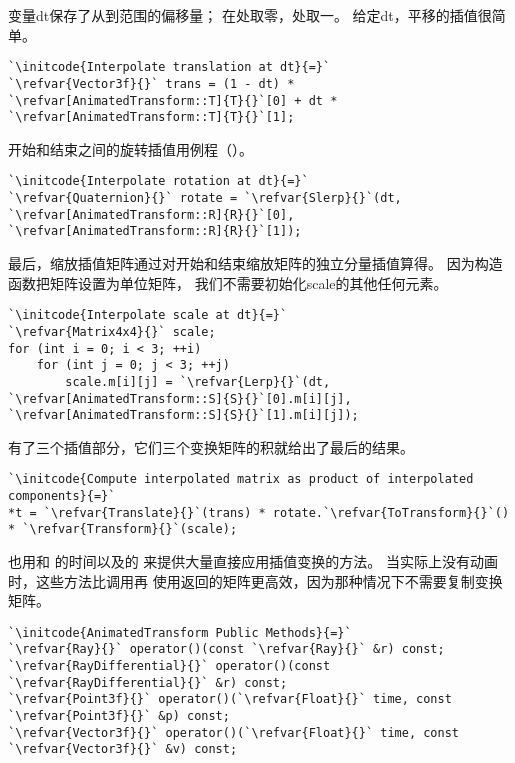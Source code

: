 变量{\ttfamily dt}保存了从到范围的偏移量；
在处取零，处取一。
给定{\ttfamily dt}，平移的插值很简单。
\begin{lstlisting}
`\initcode{Interpolate translation at dt}{=}`
`\refvar{Vector3f}{}` trans = (1 - dt) * `\refvar[AnimatedTransform::T]{T}{}`[0] + dt * `\refvar[AnimatedTransform::T]{T}{}`[1];
\end{lstlisting}

开始和结束之间的旋转插值用例程（）。
\begin{lstlisting}
`\initcode{Interpolate rotation at dt}{=}`
`\refvar{Quaternion}{}` rotate = `\refvar{Slerp}{}`(dt, `\refvar[AnimatedTransform::R]{R}{}`[0], `\refvar[AnimatedTransform::R]{R}{}`[1]);
\end{lstlisting}

最后，缩放插值矩阵通过对开始和结束缩放矩阵的独立分量插值算得。
因为构造函数把矩阵设置为单位矩阵，
我们不需要初始化{\ttfamily scale}的其他任何元素。
\begin{lstlisting}
`\initcode{Interpolate scale at dt}{=}`
`\refvar{Matrix4x4}{}` scale;
for (int i = 0; i < 3; ++i)
    for (int j = 0; j < 3; ++j)
        scale.m[i][j] = `\refvar{Lerp}{}`(dt, `\refvar[AnimatedTransform::S]{S}{}`[0].m[i][j], `\refvar[AnimatedTransform::S]{S}{}`[1].m[i][j]);
\end{lstlisting}

有了三个插值部分，它们三个变换矩阵的积就给出了最后的结果。
\begin{lstlisting}
`\initcode{Compute interpolated matrix as product of interpolated components}{=}`
*t = `\refvar{Translate}{}`(trans) * rotate.`\refvar{ToTransform}{}`() * `\refvar{Transform}{}`(scale);
\end{lstlisting}

也用和
的时间以及的
来提供大量直接应用插值变换的方法。
当实际上没有动画时，这些方法比调用再
使用返回的矩阵更高效，因为那种情况下不需要复制变换矩阵。
\begin{lstlisting}
`\initcode{AnimatedTransform Public Methods}{=}`
`\refvar{Ray}{}` operator()(const `\refvar{Ray}{}` &r) const;
`\refvar{RayDifferential}{}` operator()(const `\refvar{RayDifferential}{}` &r) const;
`\refvar{Point3f}{}` operator()(`\refvar{Float}{}` time, const `\refvar{Point3f}{}` &p) const;
`\refvar{Vector3f}{}` operator()(`\refvar{Float}{}` time, const `\refvar{Vector3f}{}` &v) const;
\end{lstlisting}

